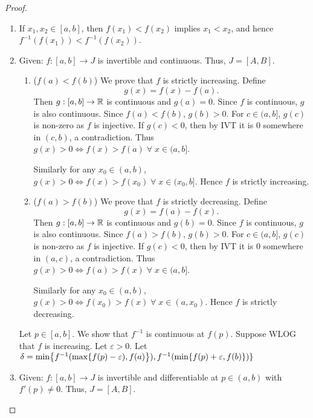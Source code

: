 \documentclass[12pt]{article}
\begin{document}
\begin{proof}
    \begin{enumerate}[label=(\roman*)]
        \item If $x_{1}, x_{2} \in [a, b]$, then $f(x_{1}) < f(x_{2})$ implies $x_{1} < x_{2}$, and hence $f^{-1}(f(x_{1})) < f^{-1}(f(x_{2}))$.
        \item Given: $f : [a, b] \to J$ is invertible and continuous. Thus, $J = [A, B]$.
        \begin{enumerate}[label= (Case \arabic*)]
            \item ($f(a) < f(b)$) We prove that $f$ is strictly increasing. Define \[
                g(x) = f(x) - f(a).
            \] Then $g : [a, b] \to \mathbb{R}$ is continuous and $g(a) = 0$. Since $f$ is continuous, $g$ is also continuous. Since $f(a) < f(b)$, $g(b) > 0$. For $c \in (a, b]$, $g(c)$ is non-zero as $f$ is injective. If $g(c) < 0$, then by IVT it is 0 somewhere in $(c, b)$, a contradiction. Thus $g(x) > 0 \iff f(x) > f(a) \;\forall\; x \in (a, b]$.

            Similarly for any $x_{0} \in (a, b)$, $g(x) > 0 \iff f(x) > f(x_{0}) \;\forall\; x \in (x_{0}, b]$. Hence $f$ is strictly increasing.

            \item ($f(a) > f(b)$) We prove that $f$ is strictly decreasing. Define \[
                g(x) = f(a) - f(x).
            \] Then $g : [a, b] \to \mathbb{R}$ is continuous and $g(b) = 0$. Since $f$ is continuous, $g$ is also continuous. Since $f(a) > f(b)$, $g(b) > 0$. For $c \in (a, b]$, $g(c)$ is non-zero as $f$ is injective. If $g(c) < 0$, then by IVT it is 0 somewhere in $(a, c)$, a contradiction. Thus $g(x) > 0 \iff f(a) > f(x) \;\forall\; x \in (a, b]$.

            Similarly for any $x_{0} \in (a, b)$, $g(x) > 0 \iff f(x_{0}) > f(x) \;\forall\; x \in (a, x_{0})$. Hence $f$ is strictly decreasing.
        \end{enumerate}
        Let $p \in [a, b]$. We show that $f^{-1}$ is continuous at $f(p)$. Suppose WLOG that $f$ is increasing. Let $\varepsilon > 0$. Let $\delta = \min \set{f^{-1}(\max \{f(p) - \varepsilon), f(a)}), f^{-1}(\min \set{f(p) + \varepsilon, f(b)})\}$

        \item Given: $f : [a, b] \to J$ is invertible and differentiable at $p \in (a, b)$ with $f'(p) \neq 0$. Thus, $J = [A, B]$.
    \end{enumerate}
\end{proof}
\end{document}
